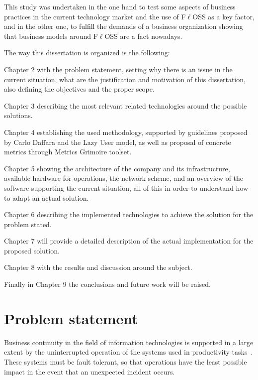 \documentclass[a4paper, 12pt]{book}
\begin{document}
\noindent This study was undertaken in the one hand to test some aspects of business practices in the current technology market and the use of F$\ell$OSS as a key factor, and in the other one, to fulfill the demands of a business organization showing that business models around F$\ell$OSS are a fact nowadays.\bigskip

\noindent The way this dissertation is organized is the following:\bigskip

\noindent Chapter 2 with the problem statement, setting why there is an issue in the current situation, what are the justification and motivation of this dissertation, also defining the objectives and the proper scope.\bigskip

\noindent Chapter 3 describing the most relevant related technologies around the possible solutions.\bigskip

\noindent Chapter 4 establishing the used methodology, supported by guidelines proposed by Carlo Daffara and the Lazy User model, as well as proposal of concrete metrics through Metrics Grimoire toolset.\bigskip

\noindent Chapter 5 showing the architecture of the company and its infrastructure, available hardware for operations, the network scheme, and an overview of the software supporting the current situation, all of this in order to understand how to adapt an actual solution.\bigskip

\noindent Chapter 6 describing the implemented technologies to achieve the solution for the problem stated.\bigskip

\noindent Chapter 7 will provide a detailed description of the actual implementation for the proposed solution.\bigskip

\noindent Chapter 8 with the results and discussion around the subject.\bigskip

\noindent Finally in Chapter 9 the conclusions and future work will be raised.\bigskip


%
\chapter{Problem statement}
\label{chap:problem}

Business continuity in the field of information technologies is supported in a large extent by the uninterrupted operation of the systems used in productivity tasks~\cite{ISO22399}. These systems must be fault tolerant, so that operations have the least possible impact in the event that an unexpected incident occurs.\bigskip
\end{document}
